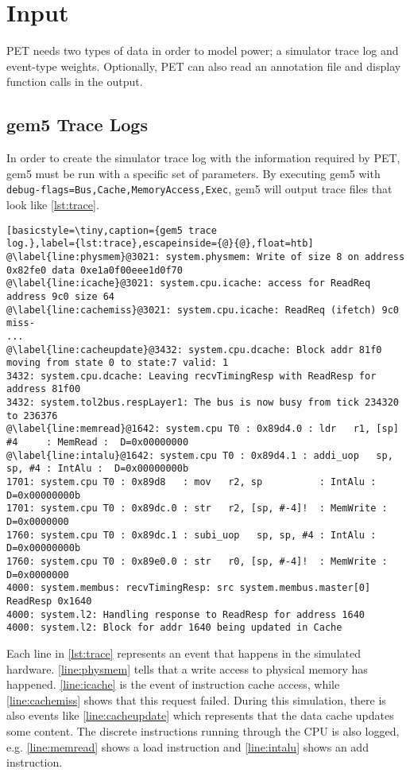 \section{Input}

PET needs two types of data in order to model power; a simulator trace log and
event-type weights. Optionally, PET can also read an annotation file and display
function calls in the output.

\subsection{gem5 Trace Logs}
In order to create the simulator trace log with the information required by PET,
gem5 must be run with a specific set of parameters. By executing gem5 with
\texttt{\textemdash\textemdash
debug-flags=Bus,\allowbreak{}Cache,\allowbreak{}MemoryAccess,\allowbreak{}Exec},
gem5 will output trace files that look like \autoref{lst:trace}.

\begin{lstlisting}[basicstyle=\tiny,caption={gem5 trace
log.},label={lst:trace},escapeinside={@}{@},float=htb]
@\label{line:physmem}@3021: system.physmem: Write of size 8 on address 0x82fe0 data 0xe1a0f00eee1d0f70
@\label{line:icache}@3021: system.cpu.icache: access for ReadReq address 9c0 size 64
@\label{line:cachemiss}@3021: system.cpu.icache: ReadReq (ifetch) 9c0 miss-
...
@\label{line:cacheupdate}@3432: system.cpu.dcache: Block addr 81f0 moving from state 0 to state:7 valid: 1
3432: system.cpu.dcache: Leaving recvTimingResp with ReadResp for address 81f00
3432: system.tol2bus.respLayer1: The bus is now busy from tick 234320 to 236376
@\label{line:memread}@1642: system.cpu T0 : 0x89d4.0 : ldr   r1, [sp] #4     : MemRead :  D=0x00000000
@\label{line:intalu}@1642: system.cpu T0 : 0x89d4.1 : addi_uop   sp, sp, #4 : IntAlu :  D=0x00000000b
1701: system.cpu T0 : 0x89d8   : mov   r2, sp          : IntAlu :  D=0x00000000b
1701: system.cpu T0 : 0x89dc.0 : str   r2, [sp, #-4]!  : MemWrite :  D=0x0000000
1760: system.cpu T0 : 0x89dc.1 : subi_uop   sp, sp, #4 : IntAlu :  D=0x00000000b
1760: system.cpu T0 : 0x89e0.0 : str   r0, [sp, #-4]!  : MemWrite :  D=0x0000000
4000: system.membus: recvTimingResp: src system.membus.master[0] ReadResp 0x1640
4000: system.l2: Handling response to ReadResp for address 1640
4000: system.l2: Block for addr 1640 being updated in Cache
\end{lstlisting}

Each line in \autoref{lst:trace} represents an event that happens in the
simulated hardware.  \autoref{line:physmem} tells that a write access to
physical memory has happened. \autoref{line:icache} is the event of instruction
cache access, while \autoref{line:cachemiss} shows that this request failed.
During this simulation, there is also events like \autoref{line:cacheupdate}
which represents that the data cache updates some content. The discrete
instructions running through the CPU is also logged, e.g. \autoref{line:memread}
shows a load instruction and \autoref{line:intalu} shows an add instruction.

